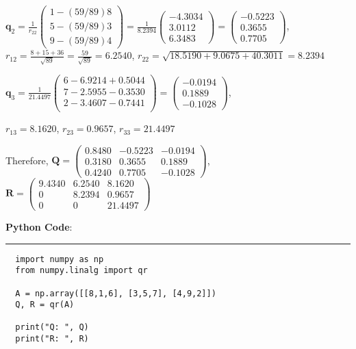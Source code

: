 \documentclass[12pt, letterpaper]{article}
\begin{document}
 $\mathbf{q}_2 = \frac{1}{r_{22}}\begin{pmatrix} 
1 - (59/89)8 \\
5 - (59/89)3 \\
9 - (59/89)4
 \end{pmatrix} = \frac{1}{8.2394}\begin{pmatrix} 
-4.3034 \\ 3.0112 \\ 6.3483
 \end{pmatrix} = \begin{pmatrix} 
-0.5223 \\ 0.3655 \\ 0.7705
 \end{pmatrix}$,\\
 $r_{12} = \frac{8 + 15 + 36}{\sqrt{89}} = \frac{59}{\sqrt{89}} = 6.2540$,
 $r_{22} = \sqrt{18.5190 + 9.0675 + 40.3011} = 8.2394$
 \bigskip

 $\mathbf{q}_3 = \frac{1}{21.4497}\begin{pmatrix}
 6 - 6.9214 + 0.5044\\
 7 - 2.5955 - 0.3530\\
 2 - 3.4607 - 0.7441\\
 \end{pmatrix} = \begin{pmatrix} 
 -0.0194 \\ 0.1889 \\ -0.1028
\end{pmatrix}$,
 \vspace{2mm}

 $r_{13} = 8.1620$,
 $r_{23} = 0.9657$,
 $r_{33} = 21.4497$
 \vspace{5mm}

 Therefore, $\mathbf{Q} = \begin{pmatrix} 
0.8480  & -0.5223 & -0.0194 \\
0.3180  & 0.3655 & 0.1889 \\
0.4240  & 0.7705 & -0.1028
 \end{pmatrix}$,
 $\mathbf{R} = \begin{pmatrix} 
9.4340  & 6.2540 & 8.1620 \\
0       & 8.2394 & 0.9657 \\
0       & 0 & 21.4497
 \end{pmatrix}$
 \vspace{5mm}

\vspace{5mm}
\textbf{Python Code}:
\hrule
\begin{verbatim}
  import numpy as np
  from numpy.linalg import qr

  A = np.array([[8,1,6], [3,5,7], [4,9,2]])
  Q, R = qr(A)

  print("Q: ", Q)
  print("R: ", R)
\end{verbatim}
\end{document}
